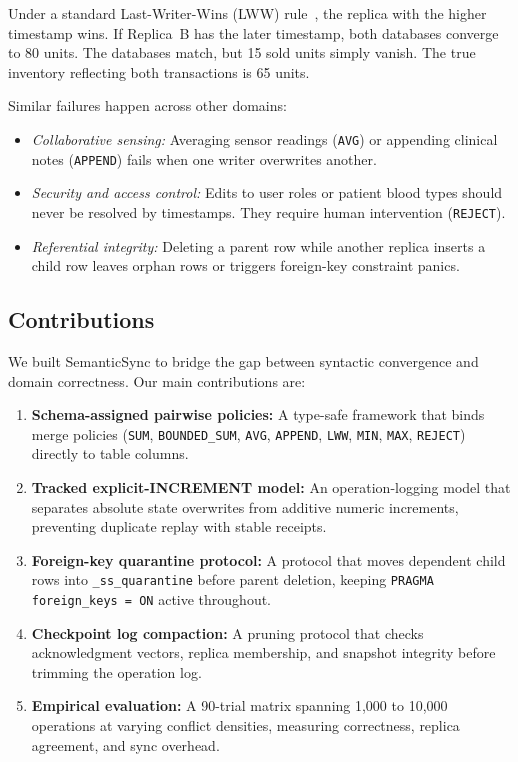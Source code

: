 \documentclass[conference]{IEEEtran}
\begin{document}
Under a standard Last-Writer-Wins (LWW) rule~\cite{dynamo2007}, the replica with the higher timestamp wins. If Replica~B has the later timestamp, both databases converge to 80 units. The databases match, but 15 sold units simply vanish. The true inventory reflecting both transactions is 65 units.

Similar failures happen across other domains:
\begin{itemize}
    \item \textit{Collaborative sensing:} Averaging sensor readings (\texttt{AVG}) or appending clinical notes (\texttt{APPEND}) fails when one writer overwrites another.
    \item \textit{Security and access control:} Edits to user roles or patient blood types should never be resolved by timestamps. They require human intervention (\texttt{REJECT}).
    \item \textit{Referential integrity:} Deleting a parent row while another replica inserts a child row leaves orphan rows or triggers foreign-key constraint panics.
\end{itemize}

\subsection{Contributions}
We built SemanticSync to bridge the gap between syntactic convergence and domain correctness. Our main contributions are:
\begin{enumerate}
    \item \textbf{Schema-assigned pairwise policies:} A type-safe framework that binds merge policies (\texttt{SUM}, \texttt{BOUNDED\_SUM}, \texttt{AVG}, \texttt{APPEND}, \texttt{LWW}, \texttt{MIN}, \texttt{MAX}, \texttt{REJECT}) directly to table columns.
    \item \textbf{Tracked explicit-INCREMENT model:} An operation-logging model that separates absolute state overwrites from additive numeric increments, preventing duplicate replay with stable receipts.
    \item \textbf{Foreign-key quarantine protocol:} A protocol that moves dependent child rows into \texttt{\_ss\_quarantine} before parent deletion, keeping \texttt{PRAGMA foreign\_keys = ON} active throughout.
    \item \textbf{Checkpoint log compaction:} A pruning protocol that checks acknowledgment vectors, replica membership, and snapshot integrity before trimming the operation log.
    \item \textbf{Empirical evaluation:} A 90-trial matrix spanning 1,000 to 10,000 operations at varying conflict densities, measuring correctness, replica agreement, and sync overhead.
\end{enumerate}
\end{document}
